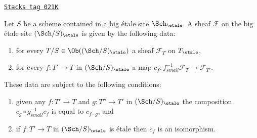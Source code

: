 \begin{lemma}
\label{topologies-lemma-characterize-sheaf-big-etale}
\href{https://stacks.math.columbia.edu/tag/021K}{\texttt{Stacks tag 021K}}

Let $S$ be a scheme contained in a big \'etale site
$\Sch_\etale$.
A sheaf $\mathcal{F}$ on the big \'etale site
$(\Sch/S)_\etale$ is given by the following data:
\begin{enumerate}
\item for every $T/S \in \Ob((\Sch/S)_\etale)$ a sheaf
$\mathcal{F}_T$ on $T_\etale$,
\item for every $f : T' \to T$ in
$(\Sch/S)_\etale$ a map
$c_f : f_{small}^{-1}\mathcal{F}_T \to \mathcal{F}_{T'}$.
\end{enumerate}
These data are subject to the following conditions:
\begin{enumerate}
\item[(a)] given any $f : T' \to T$ and $g : T'' \to T'$ in
$(\Sch/S)_\etale$ the composition
$c_g \circ g_{small}^{-1}c_f$ is equal to $c_{f \circ g}$, and
\item[(b)] if $f : T' \to T$ in $(\Sch/S)_\etale$
is \'etale then $c_f$ is an isomorphism.
\end{enumerate}
\end{lemma}

